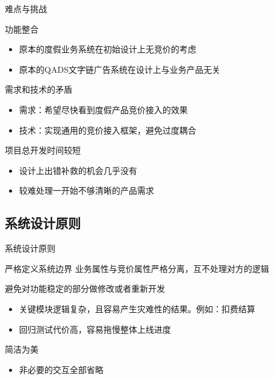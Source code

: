 \documentclass{beamer}
\begin{document}
\begin{CJK}{UTF8}{gbsn}
\begin{frame}{难点与挑战}
  \begin{block}{功能整合}
    \begin{itemize}
      \item {
        原本的度假业务系统在初始设计上无竞价的考虑
      }
      \item {
        原本的QADS文字链广告系统在设计上与业务产品无关
      }
    \end{itemize}
    \pause
  \end{block}
  \begin{block}{需求和技术的矛盾}
    \begin{itemize}
    \item {
      需求：希望尽快看到度假产品竞价接入的效果
    }
    \item {
      技术：实现通用的竞价接入框架，避免过度耦合
    }
    \end{itemize}
    \pause
  \end{block}
  \begin{block}{项目总开发时间较短}
    \begin{itemize}
      \item {
        设计上出错补救的机会几乎没有
      }
      \item {
        较难处理一开始不够清晰的产品需求
      }
    \end{itemize}
  \end{block}
\end{frame}

\subsection{系统设计原则}

\begin{frame}{系统设计原则}
  \begin{block}{严格定义系统边界}
    业务属性与竞价属性严格分离，互不处理对方的逻辑
    \pause
  \end{block}
  \begin{block}{避免对功能稳定的部分做修改或者重新开发}
    \begin{itemize}
      \item {
        关键模块逻辑复杂，且容易产生灾难性的结果。例如：扣费结算
      }
      \item {
        回归测试代价高，容易拖慢整体上线进度
      }
    \end{itemize}
    \pause
  \end{block}
  \begin{block}{简洁为美}
    \begin{itemize}
      \item {
        非必要的交互全部省略
      }
    \end{itemize}
  \end{block}
\end{frame}


\end{CJK}
\end{document}
